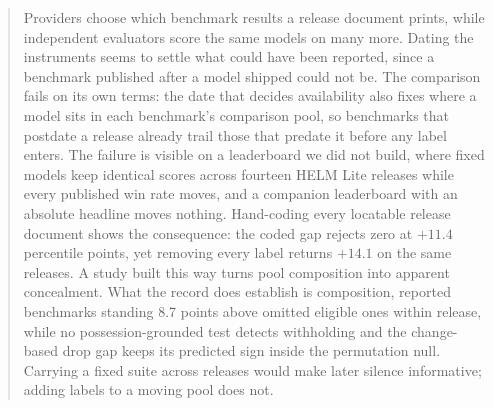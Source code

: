 \begin{abstract}
Providers choose which benchmark results a release document prints, while independent evaluators score the same models on many more. Dating the instruments seems to settle what could have been reported, since a benchmark published after a model shipped could not be. The comparison fails on its own terms: the date that decides availability also fixes where a model sits in each benchmark's comparison pool, so benchmarks that postdate a release already trail those that predate it before any label enters. The failure is visible on a leaderboard we did not build, where fixed models keep identical scores across fourteen HELM Lite releases while every published win rate moves, and a companion leaderboard with an absolute headline moves nothing. Hand-coding every locatable release document shows the consequence: the coded gap rejects zero at $+11.4$ percentile points, yet removing every label returns $+14.1$ on the same releases. A study built this way turns pool composition into apparent concealment. What the record does establish is composition, reported benchmarks standing 8.7 points above omitted eligible ones within release, while no possession-grounded test detects withholding and the change-based drop gap keeps its predicted sign inside the permutation null. Carrying a fixed suite across releases would make later silence informative; adding labels to a moving pool does not.
\end{abstract}
